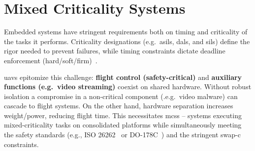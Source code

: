 


\section{Mixed Criticality Systems}%
\label{sec:mixed-crit-syst}
Embedded systems have stringent requirements both on timing and criticality of
the tasks it performs.
Criticality designations (e.g.~\glspl{asil}, \glspl{dal}, and \glspl{sil})
define the rigor needed to prevent failures, while timing constraints dictate
deadline enforcement (hard/soft/firm)~\cite{burns2022mixed}.

\glspl{uav} epitomize this challenge: \textbf{flight control (safety-critical)}
and \textbf{auxiliary functions (e.g.~video streaming)} coexist on shared
hardware. Without robust isolation a compromise in a non-critical component
(.e.g.~video malware) can cascade to flight systems. On the other hand, hardware separation increases weight/power, reducing flight time.
This necessitates \glspl{mcs} -- systems executing mixed-criticality tasks on
consolidated platforms while simultaneously meeting the safety standards (e.g.,
ISO 26262~\cite{iso26262} or DO-178C~\cite{johnson1998sw}) and the stringent \gls{swap-c} constraints.

